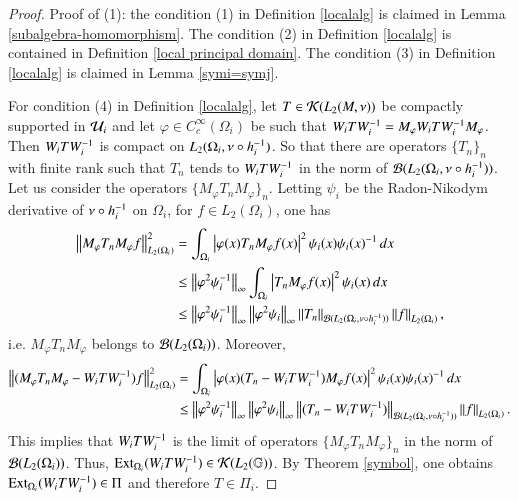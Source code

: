 \documentclass[leqno]{amsart}
\begin{document}
	\begin{proof}
		Proof of (1): the condition (1) in Definition \ref{localalg} is claimed in Lemma \ref{subalgebra-homomorphism}. 
		The condition (2) in Definition \ref{localalg} is contained in Definition \ref{local principal domain}. 
		The condition (3) in Definition \ref{localalg} is claimed in Lemma \ref{symi=symj}.
		
		For condition (4) in Definition \ref{localalg}, let $T\in{\mathcal K}(L_{2}(M,\nu))$ be compactly supported in ${\mathcal U}_{i}$ and let $\varphi\in C_{c}^{\infty}(\Omega_{i})$ be such that $W_{i}T W_{i}^{-1}=M_{\varphi}W_{i}T W_{i}^{-1} M_{\varphi}$. Then $W_{i}T W_{i}^{-1}$ is compact on $L_{2}(\Omega_{i},\nu\circ h_{i}^{-1})$. So that there are operators $\{T_{n}\}_{n}$ with finite rank such that $T_{n}$ tends to $W_{i}TW_{i}^{-1}$ in the norm of ${\mathcal B}(L_{2}(\Omega_{i},\nu\circ h_{i}^{-1}))$. Let us consider the operators $\{M_{\varphi}T_{n}M_{\varphi}\}_{n}$.
		Letting $\psi_{i}$ be the Radon-Nikodym derivative of $\nu\circ h_{i}^{-1}$ on $\Omega_{i}$, for $f\in L_{2}(\Omega_{i})$, one has
		\begin{align*}
			\left\| M_{\varphi}T_{n}M_{\varphi}f \right\|_{L_{2}(\Omega_{i})}^{2}
			&=\int_{\Omega_{i}}\left|\varphi(x)T_{n}M_{\varphi}f(x)\right|^{2}\psi_{i}(x)\psi_{i}(x)^{-1} \,dx\\
			&\leq\left\| \varphi^{2}\psi_{i}^{-1} \right\|_{\infty}\int_{\Omega_{i}}\left|T_{n}M_{\varphi}f(x)\right|^{2}\psi_{i}(x)\,dx\\
			&\leq\left\| \varphi^{2}\psi_{i}^{-1} \right\|_{\infty}\left\| \varphi^{2}\psi_{i} \right\|_{\infty}\left\| T_{n} \right\|_{{\mathcal B}(L_{2}(\Omega_{i},\nu\circ h_{i}^{-1}))}\left\| f \right\|_{L_{2}(\Omega_{i})},
		\end{align*}
		i.e. $M_{\varphi}T_{n}M_{\varphi}$ belongs to ${\mathcal B}(L_{2}(\Omega_{i}))$.
		Moreover,
		\begin{align*}
			\left\| (M_{\varphi}T_{n}M_{\varphi}-W_{i}TW_{i}^{-1})f \right\|_{L_{2}(\Omega_{i})}^{2}
			&=\int_{\Omega_{i}}\left|\varphi(x)(T_{n}-W_{i}TW_{i}^{-1})M_{\varphi}f(x)\right|^{2}\psi_{i}(x)\psi_{i}(x)^{-1} \,dx\\
			&\leq\left\| \varphi^{2}\psi_{i}^{-1} \right\|_{\infty}\left\| \varphi^{2}\psi_{i} \right\|_{\infty}\left\| (T_{n}-W_{i}TW_{i}^{-1}) \right\|_{{\mathcal B}(L_{2}(\Omega_{i},\nu\circ h_{i}^{-1}))}\left\| f \right\|_{L_{2}(\Omega_{i})}.
		\end{align*}
		This implies that $W_{i}TW_{i}^{-1}$ is the limit of operators $\{M_{\varphi}T_{n}M_{\varphi}\}_{n}$ in the norm of ${\mathcal B}(L_{2}(\Omega_{i}))$.
		Thus, ${\rm Ext}_{\Omega_{i}}(W_{i}T W_{i}^{-1})\in{\mathcal K}(L_{2}(\mathbb{G}))$.  By Theorem \ref{symbol}, one obtains ${\rm Ext}_{\Omega_{i}}(W_{i}T W_{i}^{-1})\in\Pi$ and therefore $T\in\Pi_{i}$.
		

\end{proof}
\end{document}
